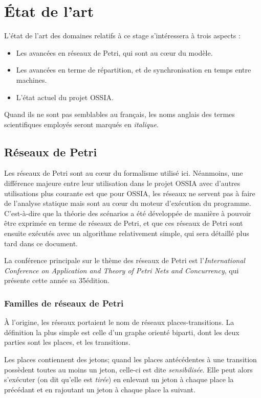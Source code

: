 \chapter{État de l'art}
\label{chapterStateOfTheArt}
L'état de l'art des domaines relatifs à ce stage s'intéressera à trois aspects : 
\begin{itemize}
	\item Les avancées en réseaux de Petri, qui sont au cœur du modèle.
	\item Les avancées en terme de répartition, et de synchronisation en temps entre machines.
	\item L'état actuel du projet \ac{OSSIA}. 
\end{itemize}

Quand ils ne sont pas semblables au français, les noms anglais des termes scientifiques employés seront marqués en \textit{italique}.

\section{Réseaux de Petri}
Les réseaux de Petri\cite{petri1962kommunikation} sont au cœur du formalisme utilisé ici. Néanmoins, une différence majeure entre leur utilisation dans le projet \ac{OSSIA} avec d'autres utilisations plus courante est que pour \ac{OSSIA}, les réseaux ne servent pas à faire de l'analyse statique mais sont au cœur du moteur d'exécution du programme. C'est-à-dire que la théorie des scénarios a été développée de manière à pouvoir être exprimée en terme de réseaux de Petri, et que ces réseaux de Petri sont ensuite exécutés avec un algorithme relativement simple, qui sera détaillé plus tard dans ce document.

La conférence principale sur le thème des réseaux de Petri est l'\textit{International Conference on Application and Theory of Petri Nets and Concurrency}, qui présente cette année sa 35\ieme édition.

\subsection{Familles de réseaux de Petri}
À l'origine, les réseaux portaient le nom de réseaux places-transitions. La définition la plus simple est celle d'un graphe orienté biparti, dont les deux parties sont les places, et les transitions.

Les places contiennent des jetons; quand les places antécédentes à une transition possèdent toutes au moins un jeton, celle-ci est dite \textit{sensibilisée}. Elle peut alors s'exécuter (on dit qu'elle est \textit{tirée}) en enlevant un jeton à chaque place la précédant et en rajoutant un jeton à chaque place la suivant.

